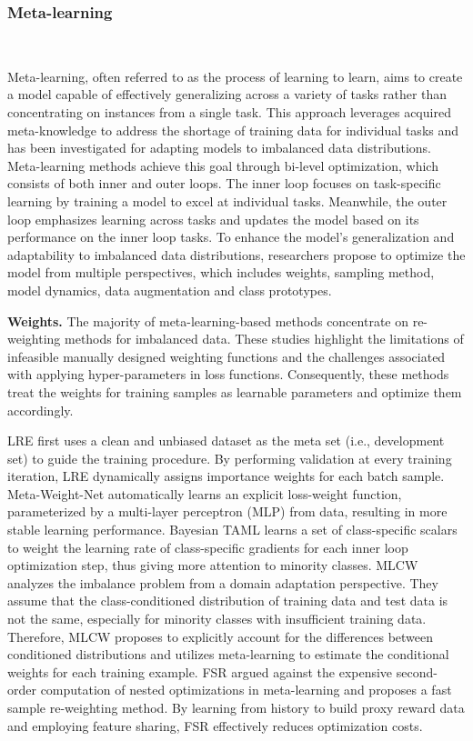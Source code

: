 \subsubsection{Meta-learning}\
\label{s326}

Meta-learning, often referred to as the process of learning to learn, aims to create a model capable of effectively generalizing across a variety of tasks rather than concentrating on instances from a single task. This approach leverages acquired meta-knowledge to address the shortage of training data for individual tasks and has been investigated for adapting models to imbalanced data distributions. Meta-learning methods achieve this goal through bi-level optimization, which consists of both inner and outer loops. The inner loop focuses on task-specific learning by training a model to excel at individual tasks. Meanwhile, the outer loop emphasizes learning across tasks and updates the model based on its performance on the inner loop tasks. To enhance the model's generalization and adaptability to imbalanced data distributions, researchers propose to optimize the model from multiple perspectives, which includes {weights, sampling method, model dynamics, data augmentation and class prototypes}.

\textbf{Weights.}
The majority of meta-learning-based methods \cite{ren2018learning, shu2019meta, lee2020l2b, jamal2020rethinking, zhang2021learning, liu2021improving} concentrate on re-weighting methods for imbalanced data. These studies highlight the limitations of infeasible manually designed weighting functions and the challenges associated with applying hyper-parameters in loss functions. Consequently, these methods treat the weights for training samples as learnable parameters and optimize them accordingly.

LRE \cite{ren2018learning} first uses a clean and unbiased dataset as the meta set (i.e., development set) to guide the training procedure. By performing validation at every training iteration, LRE dynamically assigns importance weights for each batch sample.
Meta-Weight-Net \cite{shu2019meta} automatically learns an explicit loss-weight function, parameterized by a multi-layer perceptron (MLP) from data, resulting in more stable learning performance. 
Bayesian TAML \cite{lee2020l2b} learns a set of class-specific scalars to weight the learning rate of class-specific gradients for each inner loop optimization step, thus giving more attention to minority classes. 
MLCW \cite{jamal2020rethinking} analyzes the imbalance problem from a domain adaptation perspective. They assume that the class-conditioned distribution of training data and test data is not the same, especially for minority classes with insufficient training data. Therefore, MLCW proposes to explicitly account for the differences between conditioned distributions and utilizes meta-learning to estimate the conditional weights for each training example. 
FSR \cite{zhang2021learning} argued against the expensive second-order computation of nested optimizations in meta-learning and proposes a fast sample re-weighting method. By learning from history to build proxy reward data and employing feature sharing, FSR effectively reduces optimization costs.


